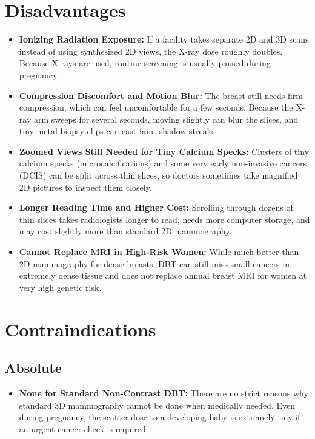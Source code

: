 \section{Disadvantages}
\begin{itemize}
\item \textbf{Ionizing Radiation Exposure:} If a facility takes separate 2D and 3D scans instead of using synthesized 2D views, the X-ray dose roughly doubles. Because X-rays are used, routine screening is usually paused during pregnancy.
\item \textbf{Compression Discomfort and Motion Blur:} The breast still needs firm compression, which can feel uncomfortable for a few seconds. Because the X-ray arm sweeps for several seconds, moving slightly can blur the slices, and tiny metal biopsy clips can cast faint shadow streaks.
\item \textbf{Zoomed Views Still Needed for Tiny Calcium Specks:} Clusters of tiny calcium specks (microcalcifications) and some very early non-invasive cancers (DCIS) can be split across thin slices, so doctors sometimes take magnified 2D pictures to inspect them closely.
\item \textbf{Longer Reading Time and Higher Cost:} Scrolling through dozens of thin slices takes radiologists longer to read, needs more computer storage, and may cost slightly more than standard 2D mammography.
\item \textbf{Cannot Replace MRI in High-Risk Women:} While much better than 2D mammography for dense breasts, DBT can still miss small cancers in extremely dense tissue and does not replace annual breast MRI for women at very high genetic risk.
\end{itemize}

\section{Contraindications}

\subsection{Absolute}
\begin{itemize}
\item \textbf{None for Standard Non-Contrast DBT:} There are no strict reasons why standard 3D mammography cannot be done when medically needed. Even during pregnancy, the scatter dose to a developing baby is extremely tiny if an urgent cancer check is required.
\end{itemize}

